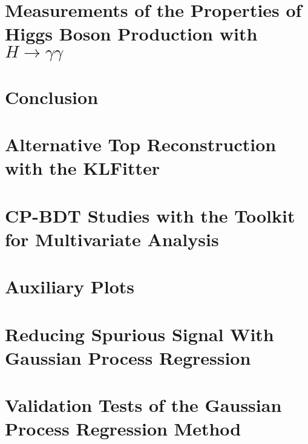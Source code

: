 \documentclass[thesis,openany]{./tex/thesis-umich}
\begin{document}
\chapter{Measurements of the Properties of Higgs Boson Production with $H \rightarrow \gamma \gamma$} \label{chap:couplings_chapter}
	 

\chapter{Conclusion} \label{chap:conclusion}
	 




\appendix

\chapter{Alternative Top Reconstruction with the KLFitter} \label{app:KLFitter}
	

\chapter{CP-BDT Studies with the Toolkit for Multivariate Analysis} \label{app:TMVABDT}
	

\chapter{Auxiliary Plots} \label{app:couplings_auxplots}
	

\chapter{Reducing Spurious Signal With Gaussian Process Regression} \label{app:gpr_templates}
	

\chapter{Validation Tests of the Gaussian Process Regression Method} \label{app:gpr_validation}
	




\end{document}
